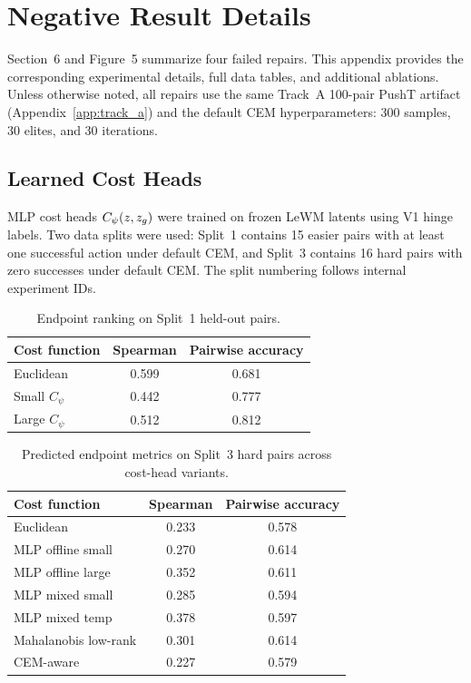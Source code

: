 \section{Negative Result Details}
\label{app:negative}

Section~6 and Figure~5 summarize four failed repairs.  This appendix
provides the corresponding experimental details, full data tables, and
additional ablations.  Unless otherwise noted, all repairs use the same
Track~A 100-pair PushT artifact (Appendix~\ref{app:track_a}) and the
default CEM hyperparameters: 300 samples, 30 elites, and 30 iterations.

\subsection{Learned Cost Heads}
\label{app:negative_cost_heads}

MLP cost heads $C_\psi(z,z_g)$ were trained on frozen LeWM latents using
V1 hinge labels.  Two data splits were used: Split~1 contains 15 easier
pairs with at least one successful action under default CEM, and Split~3
contains 16 hard pairs with zero successes under default CEM.  The split
numbering follows internal experiment IDs.

\begin{table}[h]
\centering
\caption{Endpoint ranking on Split~1 held-out pairs.}
\label{tab:h-cost-split1}
\small
\begin{tabular}{lcc}
\toprule
Cost function & Spearman & Pairwise accuracy \\
\midrule
Euclidean & 0.599 & 0.681 \\
Small $C_\psi$ & 0.442 & 0.777 \\
Large $C_\psi$ & 0.512 & 0.812 \\
\bottomrule
\end{tabular}
\end{table}

\begin{table}[h]
\centering
\caption{Predicted endpoint metrics on Split~3 hard pairs across
cost-head variants.}
\label{tab:h-cost-split3}
\small
\begin{tabular}{lcc}
\toprule
Cost function & Spearman & Pairwise accuracy \\
\midrule
Euclidean & 0.233 & 0.578 \\
MLP offline small & 0.270 & 0.614 \\
MLP offline large & 0.352 & 0.611 \\
MLP mixed small & 0.285 & 0.594 \\
MLP mixed temp & 0.378 & 0.597 \\
Mahalanobis low-rank & 0.301 & 0.614 \\
CEM-aware & 0.227 & 0.579 \\
\bottomrule
\end{tabular}
\end{table}

